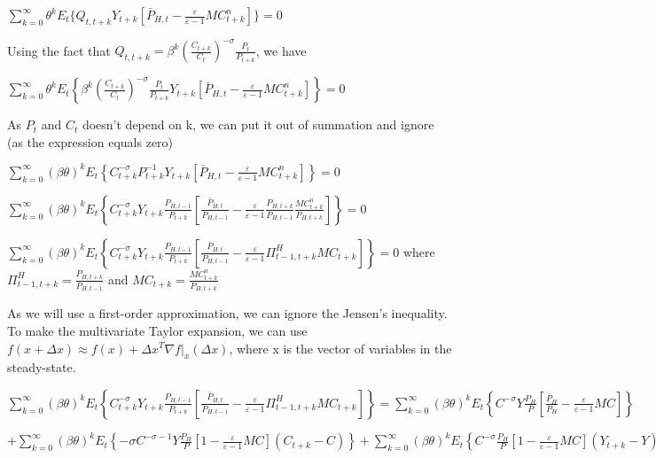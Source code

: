 \documentclass[
]{article}
\begin{document}
\(\displaystyle \sum_{k=0}^\infty \theta^kE_t \bigg\{ Q_{t,t+k} Y_{t+k } \left[ \bar{P}_{H,t}-\frac{\varepsilon}{\varepsilon-1} MC_{t+k}^n \right] \bigg\} = 0\)

Using the fact that
\(\displaystyle Q_{t,t+k}=\beta^k \left( \frac{C_{t+k}}{C_t} \right)^{-\sigma}\frac{P_t}{P_{t+k}}\),
we have

\(\displaystyle \sum_{k=0}^\infty \theta^kE_t \left\{ \beta^k \left( \frac{C_{t+k}}{C_t} \right)^{-\sigma}\frac{P_t}{P_{t+k}} Y_{t+k } \left[ \bar{P}_{H,t}-\frac{\varepsilon}{\varepsilon-1} MC_{t+k}^n \right] \right\} = 0\)

As \(P_t\) and \(C_t\) doesn't depend on k, we can put it out of
summation and ignore (as the expression equals zero)

\(\displaystyle \sum_{k=0}^\infty (\beta \theta)^kE_t \left\{ C_{t+k}^{-\sigma}P_{t+k}^{-1} Y_{t+k } \left[ \bar{P}_{H,t}-\frac{\varepsilon}{\varepsilon-1} MC_{t+k}^n \right] \right\} = 0\)

\(\displaystyle \sum_{k=0}^\infty (\beta \theta)^kE_t \left\{ C_{t+k}^{-\sigma} Y_{t+k } \frac{P_{H,t-1}}{P_{t+k}} \left[ \frac{\bar{P}_{H,t}}{P_{H,t-1}}-\frac{\varepsilon}{\varepsilon-1}\frac{P_{H,t+k}}{P_{H,t-1}} \frac{MC_{t+k}^n}{P_{H,t+k}} \right] \right\} = 0\)

\(\displaystyle \sum_{k=0}^\infty (\beta \theta)^kE_t \left\{ C_{t+k}^{-\sigma} Y_{t+k } \frac{P_{H,t-1}}{P_{t+k}} \left[ \frac{\bar{P}_{H,t}}{P_{H,t-1}}-\frac{\varepsilon}{\varepsilon-1}\Pi_{t-1,t+k}^H MC_{t+k}\right] \right\} = 0\)
where \(\displaystyle \Pi_{t-1,t+k}^H = \frac{P_{H,t+k}}{P_{H,t-1}}\)
and \(\displaystyle MC_{t+k} = \frac{MC_{t+k}^n}{P_{H,t+k}}\)

As we will use a first-order approximation, we can ignore the Jensen's
inequality. To make the multivariate Taylor expansion, we can use
\(f(x+\Delta x) \approx f(x)+ \Delta x^T \nabla f|_x(\Delta x)\), where
x is the vector of variables in the steady-state.

\(\displaystyle \sum_{k=0}^\infty (\beta \theta)^kE_t \left\{ C_{t+k}^{-\sigma} Y_{t+k } \frac{P_{H,t-1}}{P_{t+k}} \left[ \frac{\bar{P}_{H,t}}{P_{H,t-1}}-\frac{\varepsilon}{\varepsilon-1}\Pi_{t-1,t+k}^H MC_{t+k}\right] \right\} = \sum_{k=0}^\infty (\beta \theta)^kE_t \left\{ C^{-\sigma} Y \frac{P_{H}}{P} \left[ \frac{\bar{P}_{H}}{P_{H}}-\frac{\varepsilon}{\varepsilon-1} MC \right] \right\}\)

\(\displaystyle + \sum_{k=0}^\infty (\beta \theta)^kE_t \left\{ -\sigma C^{-\sigma-1} Y \frac{P_{H}}{P} \left[ 1-\frac{\varepsilon}{\varepsilon-1} MC \right](C_{t+k}-C) \right\} + \sum_{k=0}^\infty (\beta \theta)^kE_t \left\{ C^{-\sigma} \frac{P_{H}}{P} \left[ 1-\frac{\varepsilon}{\varepsilon-1} MC \right](Y_{t+k}-Y) \right\}\)
\end{document}
